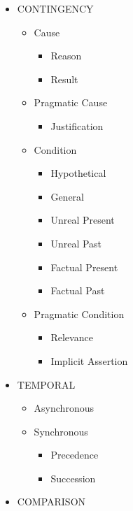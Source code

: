 \documentclass{KodeBook}
\begin{document}
\begin{figure}[!ht]
	\centering
\begin{minipage}{.3\textwidth}
	\scriptsize\bfseries
\begin{itemize}
	\item CONTINGENCY
	\begin{itemize}
		\item Cause
		\begin{itemize}
			\item Reason
			\item Result
		\end{itemize}
		\item Pragmatic Cause
		\begin{itemize}
			\item Justification
		\end{itemize}
		\item Condition
		\begin{itemize}
			\item Hypothetical
			\item General
			\item Unreal Present
			\item Unreal Past
			\item Factual Present
			\item Factual Past
		\end{itemize}
		\item Pragmatic Condition
		\begin{itemize}
			\item Relevance
			\item Implicit Assertion
		\end{itemize}
	\end{itemize}
\end{itemize}
\end{minipage}
\begin{minipage}{.3\textwidth}
	\scriptsize\bfseries
\begin{itemize}
	\item TEMPORAL
	\begin{itemize}
		\item Asynchronous
		\item Synchronous
		\begin{itemize}
			\item Precedence
			\item Succession
		\end{itemize}
	\end{itemize}
	\item COMPARISON

\end{itemize}
\end{minipage}
\end{figure}
\end{document}

